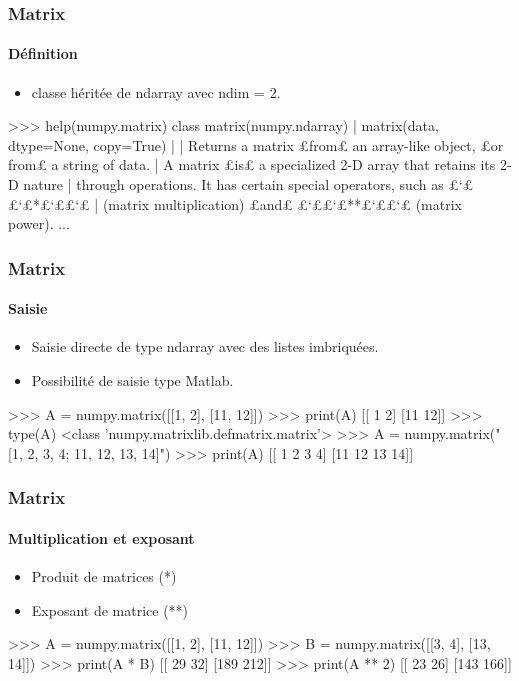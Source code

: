 \begin{frame}[fragile]
\frametitle{Matrix}
\framesubtitle{Définition}
\begin{itemize}
 \item classe héritée de ndarray avec ndim = 2.  
\end{itemize}
\begin{pythonConsole}
>>> help(numpy.matrix)
class matrix(numpy.ndarray)
 |  matrix(data, dtype=None, copy=True)
 |  
 |  Returns a matrix £from£ an array-like object, £or from£ a string of data.
 |  A matrix £is£ a specialized 2-D array that retains its 2-D nature
 |  through operations.  It has certain special operators, such as £`££`£*£`££`£
 |  (matrix multiplication) £and£ £`££`£**£`££`£ (matrix power).
...
\end{pythonConsole}
\end{frame}
\begin{frame}[fragile]
\frametitle{Matrix}
\framesubtitle{Saisie}
\begin{itemize}
 \item Saisie directe de type ndarray avec des listes imbriquées. 
 \item Possibilité de saisie type Matlab.
\end{itemize}
\begin{pythonConsole}
>>> A = numpy.matrix([[1, 2], [11, 12]])
>>> print(A)
[[ 1  2]
 [11 12]]
>>> type(A)
 <class 'numpy.matrixlib.defmatrix.matrix'>
>>> A = numpy.matrix("[1, 2, 3, 4; 11, 12, 13, 14]")
>>> print(A)
[[ 1  2  3  4]
 [11 12 13 14]]
\end{pythonConsole}
\end{frame}
\begin{frame}[fragile]
\frametitle{Matrix}
\framesubtitle{Multiplication et exposant}
\begin{itemize}
 \item Produit de matrices (*)
 \item Exposant de matrice (**)
\end{itemize}
\begin{pythonConsole}
>>> A = numpy.matrix([[1, 2], [11, 12]])
>>> B = numpy.matrix([[3, 4], [13, 14]])
>>> print(A * B)
[[ 29  32]
 [189 212]]
>>> print(A ** 2)
[[ 23  26]
 [143 166]]
\end{pythonConsole}
\end{frame}
